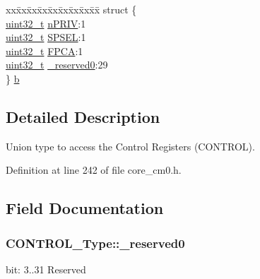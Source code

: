 \begin{DoxyCompactItemize}
\begin{tabbing}
\end{tabbing}\item 
\begin{tabbing}
xx\=xx\=xx\=xx\=xx\=xx\=xx\=xx\=xx\=\kill
struct \{\\
\>\hyperlink{stdint_8h_a435d1572bf3f880d55459d9805097f62}{uint32\_t} \hyperlink{union_c_o_n_t_r_o_l___type_a35c1732cf153b7b5c4bd321cf1de9605}{nPRIV}:1\\
\>\hyperlink{stdint_8h_a435d1572bf3f880d55459d9805097f62}{uint32\_t} \hyperlink{union_c_o_n_t_r_o_l___type_a8cc085fea1c50a8bd9adea63931ee8e2}{SPSEL}:1\\
\>\hyperlink{stdint_8h_a435d1572bf3f880d55459d9805097f62}{uint32\_t} \hyperlink{union_c_o_n_t_r_o_l___type_ac62cfff08e6f055e0101785bad7094cd}{FPCA}:1\\
\>\hyperlink{stdint_8h_a435d1572bf3f880d55459d9805097f62}{uint32\_t} \hyperlink{union_c_o_n_t_r_o_l___type_af8c314273a1e4970a5671bd7f8184f50}{\_reserved0}:29\\
\} \hyperlink{union_c_o_n_t_r_o_l___type_a4e61a86f33ae70b0716f7f728bd7967b}{b}\\

\end{tabbing}\end{DoxyCompactItemize}


\subsection{Detailed Description}
Union type to access the Control Registers (C\-O\-N\-T\-R\-O\-L). 

Definition at line 242 of file core\-\_\-cm0.\-h.



\subsection{Field Documentation}
\hypertarget{union_c_o_n_t_r_o_l___type_af8c314273a1e4970a5671bd7f8184f50}{
\subsubsection[{\-\_\-reserved0}]{ C\-O\-N\-T\-R\-O\-L\-\_\-\-Type\-::\-\_\-reserved0}}\label{union_c_o_n_t_r_o_l___type_af8c314273a1e4970a5671bd7f8184f50}
bit\-: 3..31 Reserved 

